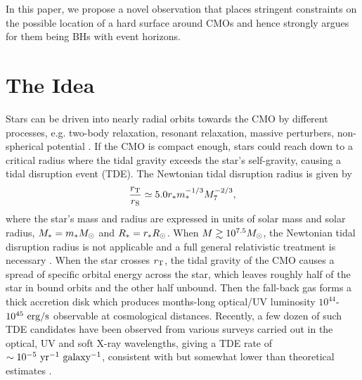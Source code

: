 \documentclass[useAMS,usenatbib]{mn2e}
\begin{document}
In this paper, we propose a novel observation that places
stringent constraints on the possible location of a hard surface
around CMOs and hence strongly argues for them being BHs with event horizons.

\section{The Idea}
Stars can be driven into nearly radial orbits towards
the CMO by different processes, e.g. two-body relaxation, resonant
relaxation, massive perturbers, non-spherical
potential \citep{2005PhR...419...65A}. If the CMO is compact enough,
stars could reach down to a critical radius 
where the tidal gravity exceeds the star's self-gravity, causing a
tidal disruption event (TDE). The Newtonian tidal disruption 
radius is given by \citep[e.g.][]{1988Natur.333..523R}
\begin{equation}
  \label{eq:1}
      \frac{r_{\rm T}}{r_{\rm S}} \simeq 5.0  r_{\rm *} m_{\rm
      *}^{-1/3} M_7^{-2/3},
\end{equation}
where the star's mass and radius are expressed in units of solar mass
and solar radius, $M_{\rm *} = m_{\rm *} M_{\rm  \odot}$ and
$R_{\rm *} = r_{\rm *} R_{\rm \odot}$. When $M\gtrsim10^{7.5}M_{\rm \odot}$,
the Newtonian tidal disruption radius is not applicable and a full
general relativistic treatment is necessary
\citep[e.g.][]{2012PhRvD..85b4037K, 2016arXiv161103036S}.
When the star crosses $r_{\rm T}$, the tidal gravity of the CMO causes
a spread of specific orbital energy across the star, which leaves
roughly half of the star in bound orbits and the other half
unbound. Then the fall-back gas forms a thick accretion disk
which produces months-long optical/UV luminosity
$10^{44}$-$10^{45}\rm\ erg/s$ 
observable at cosmological distances. Recently, a few dozen of such
TDE candidates have been observed from various surveys carried out
in the optical, UV and soft X-ray wavelengths, giving a TDE rate of
$\sim 10^{-5}\rm\ yr^{-1}\ galaxy^{-1}$, consistent with but somewhat lower
than theoretical estimates \citep[see the review
by][]{2015JHEAp...7..148K}.
\end{document}
